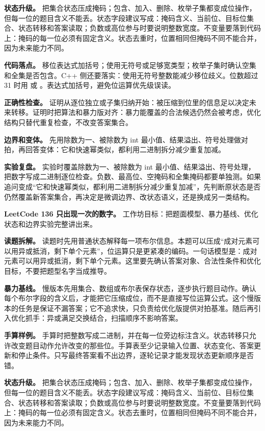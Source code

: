 \textbf{状态升级。} 把集合状态压成掩码；包含、加入、删除、枚举子集都变成位操作，但每一位的题目含义不能丢。状态字段建议写成：掩码含义、当前位、目标位集合、状态转移和答案读取；负数或高位参与时要说明整数宽度。不变量要落到代码上：掩码的每一位必须有固定含义。状态去重时，位置相同但掩码不同不能合并，因为未来能力不同。

\textbf{代码落点。} 移位表达式加括号；使用无符号或足够宽类型；枚举子集时确认空集和全集是否包含。C++ 侧还要落实：使用无符号整数能减少移位歧义。位数超过 31 时用  或 。表达式加括号，避免位运算优先级误读。

\textbf{正确性检查。} 证明从逐位独立或子集归纳开始：被压缩到位里的信息足以决定未来转移。证明时把算法和暴力版对齐：暴力能覆盖的合法候选仍然会被考虑，优化结构只替代重复检查，不改变答案集合。

\textbf{边界和变体。} 先用除数为一、被除数为 int 最小值、结果溢出、符号处理做对拍，再回答变体：它和快速幂类似，都利用二进制拆分减少重复加减。

\textbf{实验复盘。} 实验时覆盖除数为一、被除数为 int 最小值、结果溢出、符号处理，把数字写成二进制逐位检查。负数、最高位、空掩码和全集掩码都要单独测。如果追问变成“它和快速幂类似，都利用二进制拆分减少重复加减”，先判断原状态是否仍然覆盖新答案集合，再决定是微调边界、改状态语义，还是换成另一类结构。

\noindent\textbf{LeetCode 136 只出现一次的数字。} 工作坊目标：把题面模型、暴力基线、优化状态和边界实验完整讲出来。

\textbf{读题拆解。} 读题时先用普通状态解释每一项布尔信息。本题可以压成“成对元素可以用异或抵消，剩下单个元素”，位运算只是更紧凑的编码。一句话模型是：成对元素可以用异或抵消，剩下单个元素。这里要先确认答案对象、合法性条件和优化目标，不要把题型名字当成推导。

\textbf{暴力基线。} 慢版本先用集合、数组或布尔表保存状态，逐步执行题目动作。确认每个布尔字段的含义后，才能把它压缩成位，而不是直接写位运算公式。这个慢版本的任务是保证不漏答案；它不追求快，只负责给优化版提供对拍基准。随后再引入优化抓手：异或满足交换结合，扫描顺序不影响答案。

\textbf{手算样例。} 手算时把整数写成二进制，并在每一位旁边标注含义。状态转移只允许改变题目动作允许改变的那些位。手算表至少记录输入位置、状态变化、答案更新和停止条件。只写最终答案看不出边界，逐轮记录才能发现状态更新顺序是否错。

\textbf{状态升级。} 把集合状态压成掩码；包含、加入、删除、枚举子集都变成位操作，但每一位的题目含义不能丢。状态字段建议写成：掩码含义、当前位、目标位集合、状态转移和答案读取；负数或高位参与时要说明整数宽度。不变量要落到代码上：掩码的每一位必须有固定含义。状态去重时，位置相同但掩码不同不能合并，因为未来能力不同。

